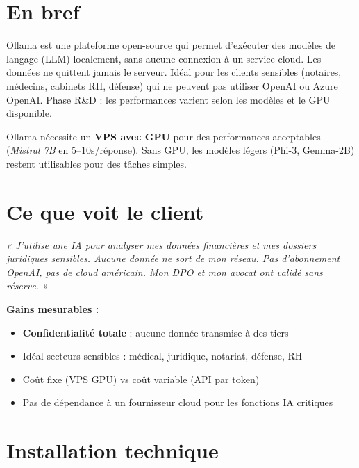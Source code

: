 \documentclass[11pt, a4paper]{article}
\begin{document}
\ficheHeader

\section*{En bref}
Ollama est une plateforme open-source qui permet d'exécuter des modèles de langage (LLM) localement, sans aucune connexion à un service cloud. Les données ne quittent jamais le serveur. Idéal pour les clients sensibles (notaires, médecins, cabinets RH, défense) qui ne peuvent pas utiliser OpenAI ou Azure OpenAI. Phase R\&D : les performances varient selon les modèles et le GPU disponible.

\begin{pointcle}
  Ollama nécessite un \textbf{VPS avec GPU} pour des performances acceptables (\textit{Mistral 7B} en 5–10s/réponse). Sans GPU, les modèles légers (Phi-3, Gemma-2B) restent utilisables pour des tâches simples.
\end{pointcle}

\section{Ce que voit le client}

\begin{clientbox}
  \textit{« J'utilise une IA pour analyser mes données financières et mes dossiers juridiques sensibles. Aucune donnée ne sort de mon réseau. Pas d'abonnement OpenAI, pas de cloud américain. Mon DPO et mon avocat ont validé sans réserve. »}
\end{clientbox}

\textbf{Gains mesurables :}
\begin{itemize}
  \item \textbf{Confidentialité totale} : aucune donnée transmise à des tiers
  \item Idéal secteurs sensibles : médical, juridique, notariat, défense, RH
  \item Coût fixe (VPS GPU) vs coût variable (API par token)
  \item Pas de dépendance à un fournisseur cloud pour les fonctions IA critiques
\end{itemize}

\section{Installation technique}
\end{document}
